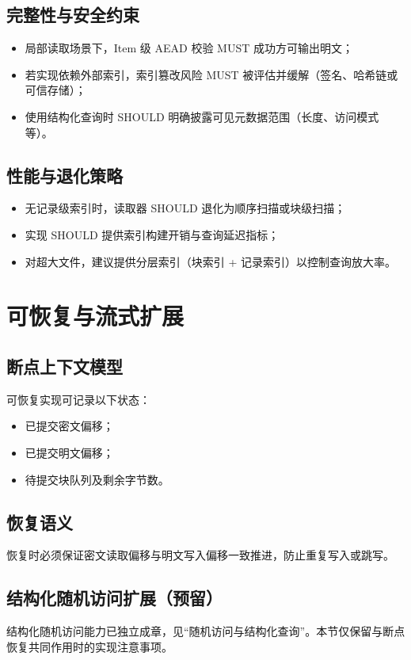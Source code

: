 \documentclass[11pt,a4paper]{article}
\begin{document}
\subsection{完整性与安全约束}
\begin{itemize}
  \item 局部读取场景下，Item 级 AEAD 校验 MUST 成功方可输出明文；
  \item 若实现依赖外部索引，索引篡改风险 MUST 被评估并缓解（签名、哈希链或可信存储）；
  \item 使用结构化查询时 SHOULD 明确披露可见元数据范围（长度、访问模式等）。
\end{itemize}

\subsection{性能与退化策略}
\begin{itemize}
  \item 无记录级索引时，读取器 SHOULD 退化为顺序扫描或块级扫描；
  \item 实现 SHOULD 提供索引构建开销与查询延迟指标；
  \item 对超大文件，建议提供分层索引（块索引 + 记录索引）以控制查询放大率。
\end{itemize}

\section{可恢复与流式扩展}
\subsection{断点上下文模型}
可恢复实现可记录以下状态：
\begin{itemize}
  \item 已提交密文偏移；
  \item 已提交明文偏移；
  \item 待提交块队列及剩余字节数。
\end{itemize}

\subsection{恢复语义}
恢复时必须保证密文读取偏移与明文写入偏移一致推进，防止重复写入或跳写。

\subsection{结构化随机访问扩展（预留）}
结构化随机访问能力已独立成章，见“随机访问与结构化查询”。本节仅保留与断点恢复共同作用时的实现注意事项。
\end{document}
